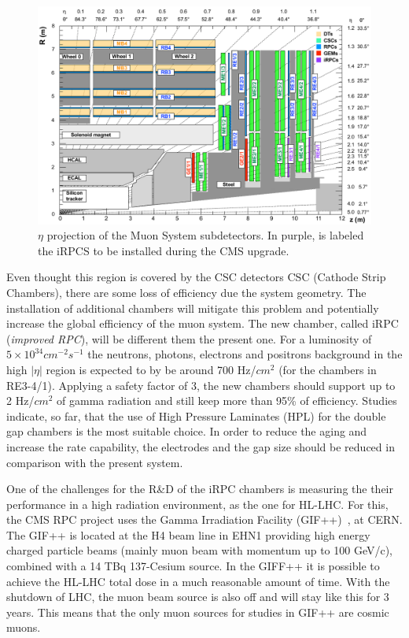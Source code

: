 \begin{figure}[h]
\begin{center}
\includegraphics[width=1.0\textwidth,keepaspectratio]{figures_and_tables/rpc/muon_eta.png}
\end{center}
\caption{$\eta$ projection of the Muon System subdetectors. In purple, is labeled the iRPCS to be installed during the CMS upgrade.}\label{muons_eta}
\end{figure}

Even thought this region is covered by the CSC detectors CSC (Cathode Strip Chambers), there are some loss of efficiency due the system geometry. The installation of additional chambers will mitigate this problem and potentially increase the global efficiency of the muon system. The new chamber, called iRPC (\textit{improved RPC}), will be different them the present one. For a luminosity of $5 \times 10^{34} cm^{-2} s^{-1}$  the neutrons, photons, electrons and positrons background in the high $|\eta|$ region is expected to by be around 700 Hz/$cm^{2}$ (for the chambers in RE3-4/1). Applying a safety factor of 3, the new chambers should support up to 2 Hz/$cm^{2}$ of gamma radiation and still keep more than 95\% of efficiency. Studies indicate, so far, that the use of High Pressure Laminates (HPL) for the double gap chambers is the most suitable choice. In order to reduce the aging and increase the rate capability, the electrodes and the gap size should be reduced in comparison with the present system.

One of the challenges for the R\&D of the iRPC chambers is measuring the their performance in a high radiation environment, as the one for HL-LHC. For this, the CMS RPC project uses the Gamma Irradiation Facility (GIF++)~\cite{gifpp}, at CERN. The GIF++ is located at the H4 beam line in EHN1 providing high energy charged particle beams (mainly muon beam with momentum up to 100 GeV/c), combined with a 14 TBq 137-Cesium source. In the GIFF++ it is possible to achieve the HL-LHC total dose in a much reasonable amount of time. With the shutdown of LHC, the muon beam source is also off and will stay like this for 3 years. This means that the only muon sources for studies in GIF++ are cosmic muons. 

